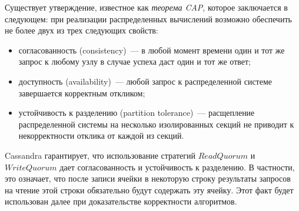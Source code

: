Существует утверждение, известное как \textit{теорема CAP}, которое заключается в следующем: при реализации распределенных вычислений возможно обеспечить не более двух из трех следующих свойств:

\begin{itemize}
	\item согласованность (consistency)~--- в любой момент времени один и тот же запрос к любому узлу в случае успеха даст один и тот же ответ;
	\item доступность (availability)~--- любой запрос к распределенной системе завершается корректным откликом;
	\item устойчивость к разделению (partition tolerance)~--- расщепление распределенной системы на несколько изолированных секций не приводит к некорректности отклика от каждой из секций.
\end{itemize}

Cassandra гарантирует, что использование стратегий $ReadQuorum$ и \\$WriteQuorum$ дает согласованность и устойчивость к разделению. В частности, это означает, что после записи ячейки в некоторую строку результаты запросов на чтение этой строки обязательно будут содержать эту ячейку. Этот факт будет использован далее при доказательстве корректности алгоритмов.